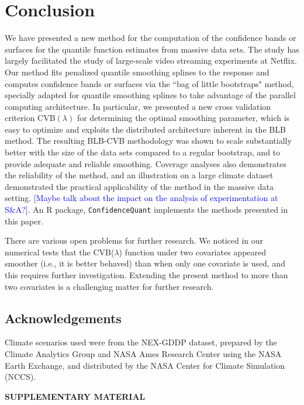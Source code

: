 \documentclass{statsoc}
\begin{document}
\section{Conclusion}
We have presented a new method for the computation of the confidence bands or surfaces for the quantile function estimates from massive data sets. The study has largely facilitated the study of large-scale video streaming experiments at Netflix. Our method fits penalized quantile smoothing splines to the response and computes confidence bands or surfaces via the ``bag of little bootstraps" method, specially adapted for quantile smoothing splines to take advantage of the parallel computing architecture. In particular, we presented a new cross validation criterion CVB$(\lambda)$ for determining the optimal smoothing parameter, which is easy to optimize and exploits the distributed architecture inherent in the BLB method. The resulting BLB-CVB methodology was shown to scale substantially better with the size of the data sets compared to a regular bootstrap, and to provide adequate and reliable smoothing. Coverage analyses also demonstrates the reliability of the method, and an illustration on a large climate dataset demonstrated the practical applicability of the method in the massive data setting. \textcolor{blue}{[Maybe talk about the impact on the analysis of experimentation at S\&A?]}. An R package, {\tt ConfidenceQuant} implements the methods presented in this paper.

There are various open problems for further research. We noticed  {in our numerical tests} that the CVB($\lambda$) function under two covariates appeared  smoother  (i.e., it is better behaved) than when only one covariate is used, and this requires further investigation. Extending the present method to more than two covariates is a  {challenging} matter for further research. 

\subsection*{Acknowledgements}
Climate scenarios used were from the NEX-GDDP dataset, prepared by the Climate Analytics Group and NASA Ames Research Center using the NASA Earth Exchange, and distributed by the NASA Center for Climate Simulation (NCCS).

\bigskip
\begin{center}
{\large\bf SUPPLEMENTARY MATERIAL}
\end{center}
\end{document}

